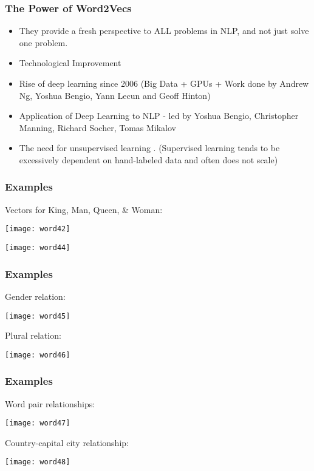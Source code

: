 \begin{frame}[fragile]\frametitle{The Power of Word2Vecs}

\begin{itemize}
\item They provide a fresh perspective to ALL  problems in NLP, and not just solve one problem.
\item Technological Improvement
\item Rise of deep learning since 2006 (Big Data + GPUs  + Work done by Andrew Ng, Yoshua Bengio, Yann Lecun and Geoff Hinton)
\item Application of Deep Learning to NLP - led by Yoshua Bengio,  Christopher Manning, Richard Socher, Tomas Mikalov
\item The need for unsupervised learning . (Supervised learning tends to be excessively dependent on hand-labeled data and often does not scale)
\end{itemize}
\end{frame}


\begin{frame}[fragile]\frametitle{Examples}
Vectors for King, Man, Queen, \& Woman:
\begin{center}
\texttt{[image: word42]}
\end{center}


\begin{center}
\texttt{[image: word44]}
\end{center}

\end{frame}

\begin{frame}[fragile]\frametitle{Examples}
Gender relation:
\begin{center}
\texttt{[image: word45]}
\end{center}
Plural relation:

\begin{center}
\texttt{[image: word46]}
\end{center}

\end{frame}


\begin{frame}[fragile]\frametitle{Examples}
Word pair relationships:
\begin{center}
\texttt{[image: word47]}
\end{center}
Country-capital city relationship:

\begin{center}
\texttt{[image: word48]}
\end{center}

\end{frame}



